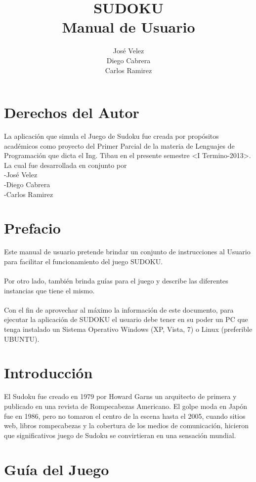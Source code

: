 \documentclass[12pt,oneside]{book}
\title{SUDOKU \\ Manual de Usuario}
\author{José Velez \\ Diego Cabrera \\ Carlos Ramirez}
\begin{document}
\maketitle
\tableofcontents


\chapter{Derechos del Autor}
La aplicaci\'on que simula el Juego de Sudoku fue creada por prop\'ositos acad\'emicos como proyecto del Primer Parcial de la materia de Lenguajes de Programación que dicta el Ing. Tibau en el presente semestre <I Termino-2013>.
\\La cual fue desarrollada en conjunto por \\-José Velez \\ -Diego Cabrera \\ -Carlos Ramirez

\chapter{Prefacio}

Este manual de usuario pretende brindar un conjunto de instrucciones al Usuario para facilitar el funcionamiento del juego SUDOKU. \ \\ \\ 
Por otro lado, también brinda guías para el juego y describe las diferentes instancias que tiene el mismo. \ \\ \\
Con el fin de aprovechar al máximo la información de este documento, para ejecutar la aplicación de SUDOKU el usuario debe tener en su poder un PC que tenga instalado un Sistema Operativo Windows (XP, Vista, 7) o Linux (preferible UBUNTU).


\chapter{Introducción}

El Sudoku  fue creado en 1979 por Howard Garns un arquitecto de primera y publicado en una revista de Rompecabezas Americano. El golpe moda en Japón fue en 1986, pero no tomaron el centro de la escena hasta el 2005, cuando sitios web, libros rompecabezas y la cobertura de los medios de comunicación, hicieron que  significativos juego de Sudoku se convirtieran en una sensación mundial.



\chapter{Guía del Juego}
\end{document}
